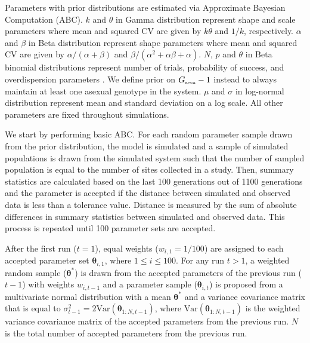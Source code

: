 \documentclass{article}\usepackage[]{graphicx}\usepackage[]{color}
\begin{document}
{\begin{landscape}
\begin{table}[h]
{Parameters with prior distributions are estimated via Approximate Bayesian Computation (ABC).
$k$ and $\theta$ in Gamma distribution represent shape and scale parameters where mean and squared CV are given by $k \theta$ and $1/k$, respectively.
$\alpha$ and $\beta$ in Beta distribution represent shape parameters where mean and squared CV are given by $\alpha/(\alpha+\beta)$ and $\beta/(\alpha^2 + \alpha \beta + \alpha)$.
$N$, $p$ and $\theta$ in Beta binomial distributions represent number of trials, probability of success, and overdispersion parameters \citep{morris1983natural}.
We define prior on $G_{\textrm{\tiny asex}} -1$ instead to always maintain at least one asexual genotype in the system.
$\mu$ and $\sigma$ in log-normal distribution represent mean and standard deviation on a log scale.
All other parameters are fixed throughout simulations.
}
\label{tb:param}
\end{table}
\end{landscape}
}

We start by performing basic ABC.
For each random parameter sample drawn from the prior distribution, the model is simulated and a sample of simulated populations is drawn from the simulated system such that the number of sampled population is equal to the number of sites collected in a study.
Then, summary statistics are calculated based on the last 100 generations out of 1100 generations and the parameter is accepted if the distance between simulated and observed data is less than a tolerance value.
Distance is measured by the sum of absolute differences in summary statistics between simulated and observed data.
This process is repeated until 100 parameter sets are accepted.

After the first run ($t=1$), equal weights ($w_{i,1}=1/100$) are assigned to each accepted parameter set $\bm\theta_{i, 1}$, where $1 \leq i \leq 100$.
For any run $t > 1$,
a weighted random sample ($\bm\theta^\ast$) is drawn from the accepted parameters of the previous run ($t-1$) with weights $w_{i,t-1}$ and
a parameter sample ($\bm\theta_{i, t}$) is proposed from a multivariate normal distribution with a mean $\bm\theta^\ast$ and a variance covariance matrix that is equal to $\sigma_{t-1}^2=2 \mathrm{Var}(\bm\theta_{1:N, t-1})$, where $\mathrm{Var}(\bm\theta_{1:N, t-1})$ is the weighted variance covariance matrix of the accepted parameters from the previous run.
$N$ is the total number of accepted parameters from the previous run.
\end{document}
